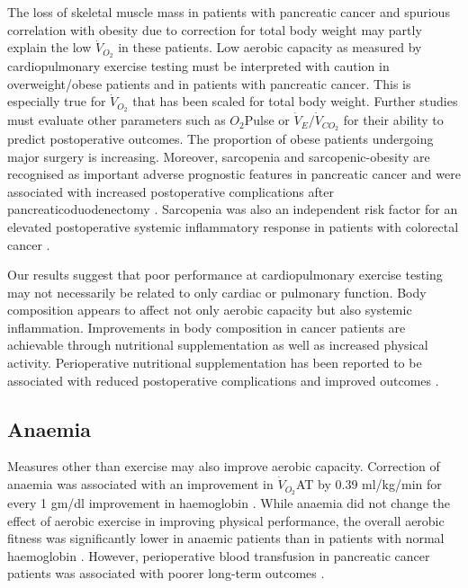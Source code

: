 The loss of skeletal muscle mass in patients with pancreatic cancer and spurious correlation with obesity due to correction for total body weight may partly explain the low $\dot{V}_{O_2}$ in these patients. 
Low aerobic capacity as measured by cardiopulmonary exercise testing must be interpreted with caution in overweight/obese patients and in patients with pancreatic cancer. 
This is especially true for $\dot{V}_{O_2}$ that has been scaled for total body weight.
Further studies must evaluate other parameters such as $O_2$Pulse or $\dot{V}_E/\dot{V}_{CO_2}$ for their ability to predict postoperative outcomes. 
The proportion of obese patients undergoing major surgery is increasing. 
Moreover, sarcopenia and sarcopenic-obesity are recognised as important adverse prognostic features in pancreatic cancer \parencite{tan_sarcopenia_2009, peng_impact_2012} and were associated with increased postoperative complications after pancreaticoduodenectomy \parencite{joglekar_sarcopenia_2015, pausch_cachexia_2012}.
Sarcopenia was also an independent risk factor for an elevated postoperative systemic inflammatory response in patients with colorectal cancer \parencite{reisinger_sarcopenia_2015}.

Our results suggest that poor performance at cardiopulmonary exercise testing may not necessarily be related to only cardiac or pulmonary function. 
Body composition appears to affect not only aerobic capacity but also systemic inflammation.
Improvements in body composition in cancer patients are achievable through nutritional supplementation \parencite{machado_whey_2015} as well as increased physical activity.
Perioperative nutritional supplementation has been reported to be associated with reduced postoperative complications and improved outcomes \parencite{kabata_preoperative_2015, zhang_perioperative_2012}.


\subsection{Anaemia}

Measures other than exercise may also improve aerobic capacity. 
Correction of anaemia was associated with an improvement in $\dot{V}_{O_2}$AT by 0.39 ml/kg/min for every 1 gm/dl improvement in haemoglobin \parencite{wright_cardiopulmonary_2014}. 
While anaemia did not change the effect of aerobic exercise in improving physical performance, the overall aerobic fitness was significantly lower in anaemic patients than in patients with normal haemoglobin \parencite{bellotto_anemia_2011}.
However, perioperative blood transfusion in pancreatic cancer patients was associated with poorer long-term outcomes \parencite{kneuertz_effects_2011, sutton_perioperative_2014}.


